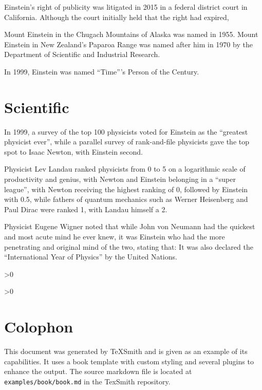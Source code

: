 \documentclass[twoside]{memoir}
\begin{document}
Einstein's right of publicity was litigated in 2015 in a federal district court in California. Although the court initially held that the right had expired,

Mount Einstein in the Chugach Mountains of Alaska was named in 1955. Mount Einstein in New Zealand's Paparoa Range was named after him in 1970 by the Department of Scientific and Industrial Research.

In 1999, Einstein was named \enquote{Time}'s Person of the Century.

\chapter{Scientific}\label{scientific}

In 1999, a survey of the top 100 physicists voted for Einstein as the \enquote{greatest physicist ever}, while a parallel survey of rank-and-file physicists gave the top spot to Isaac Newton, with Einstein second.

Physicist Lev Landau ranked physicists from 0 to 5 on a logarithmic scale of productivity and genius, with Newton and Einstein belonging in a \enquote{super league}, with Newton receiving the highest ranking of 0, followed by Einstein with 0.5, while fathers of quantum mechanics such as Werner Heisenberg and Paul Dirac were ranked 1, with Landau himself a 2.

Physicist Eugene Wigner noted that while John von Neumann had the quickest and most acute mind he ever knew, it was Einstein who had the more penetrating and original mind of the two, stating that:\cite{Szanton_1992} It was also declared the \enquote{International Year of Physics} by the United Nations.

\backmatter

\ifnum\value{figure}>0
\clearpage
\listoffigures
\fi
\ifnum\value{table}>0
\clearpage
\listoftables
\fi

\printglossary[type=\acronymtype]
\printindex
\printbibliography

\cleardoublepage
{}
{}
\chapter*{Colophon}
This document was generated by TeXSmith and is given as an example of its capabilities. It uses a book template with custom styling and several plugins to enhance the output. The source markdown file is located at \texttt{examples/book/book.md} in the TexSmith repository.
\end{document}
